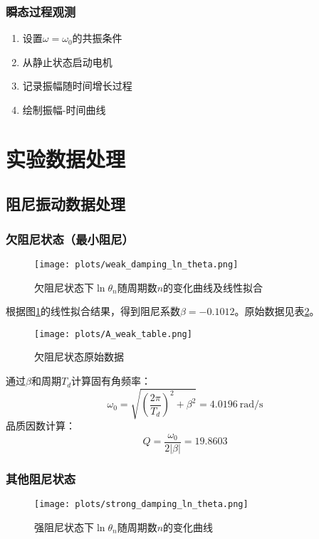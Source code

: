 \documentclass[UTF8]{ctexart}
\begin{document}
\subsubsection{瞬态过程观测}
\begin{enumerate}
\item 设置$\omega=\omega_0$的共振条件
\item 从静止状态启动电机
\item 记录振幅随时间增长过程
\item 绘制振幅-时间曲线
\end{enumerate}

\section{实验数据处理}

\subsection{阻尼振动数据处理}

\subsubsection{欠阻尼状态（最小阻尼）}
\begin{figure}[H]
    \centering
    \texttt{[image: plots/weak\_damping\_ln\_theta.png]}
    \caption{欠阻尼状态下$\ln\theta_n$随周期数$n$的变化曲线及线性拟合}
    \label{fig:weak_ln_theta}
\end{figure}

根据图\ref{fig:weak_ln_theta}的线性拟合结果，得到阻尼系数$\beta = -0.1012$。原始数据见表\ref{tab:A_weak}。

\begin{figure}[H]
    \centering
    \texttt{[image: plots/A\_weak\_table.png]}
    \caption{欠阻尼状态原始数据}
    \label{tab:A_weak}
\end{figure}

通过$\beta$和周期$T_d$计算固有角频率：
\[
\omega_0 = \sqrt{\left(\frac{2\pi}{T_d}\right)^2 + \beta^2} = 4.0196\ \text{rad/s}
\]
品质因数计算：
\[
Q = \frac{\omega_0}{2|\beta|} = 19.8603
\]

\subsubsection{其他阻尼状态}
\begin{figure}[H]
    \centering
    \texttt{[image: plots/strong\_damping\_ln\_theta.png]}
    \caption{强阻尼状态下$\ln\theta_n$随周期数$n$的变化曲线}
    \label{fig:strong_ln_theta}
\end{figure}
\end{document}
